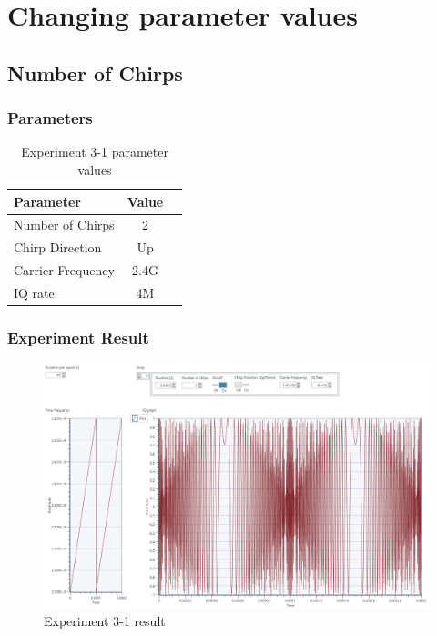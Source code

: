 \section{Changing parameter values}
\subsection{Number of Chirps}
    
    \subsubsection*{Parameters}
    \begin{table}[!h]\centering
        \hspace{10mm}
        \begin{tabular}{|l|c|c|}
        \hline
        \multicolumn{1}{|l|}{Parameter} & \multicolumn{1}{l|}{Value} \\
        \hline
        Number of Chirps & 2 \\ 
        \hline
        Chirp Direction & Up \\ 
        \hline
        Carrier Frequency & 2.4G \\ 
        \hline
        IQ rate & 4M \\ 
        \hline
        \end{tabular}
        \caption{Experiment 3-1 parameter values}
    \end{table}
    
    \subsubsection*{Experiment Result}
    \vspace{-4mm}  
    \begin{figure}[!h]\raggedleft
    \hspace{15mm}
		\includegraphics[width=.95\textwidth]{image/week03/3-1-1.png}
		\caption{\footnotesize Experiment 3-1 result}
		\vspace{-10pt}
    \end{figure}
    
